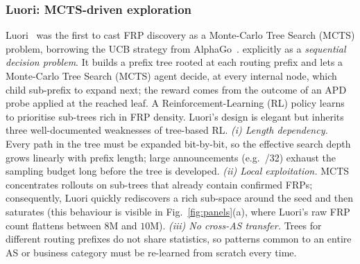 \documentclass[conference]{IEEEtran}
\begin{document}
\subsubsection{Luori: MCTS-driven exploration}
\label{sec:bg:luori}
Luori~\cite{cheng2024luori} was the first to cast FRP discovery
as a Monte-Carlo Tree Search (MCTS) problem, borrowing the UCB
strategy from AlphaGo~\cite{silver2016mcts}.
explicitly as a \emph{sequential decision problem}.  It builds a
prefix tree rooted at each routing prefix and lets a Monte-Carlo
Tree Search (MCTS) agent decide, at every internal node, which
child sub-prefix to expand next; the reward comes from the
outcome of an APD probe applied at the reached leaf.  A
Reinforcement-Learning (RL) policy learns to prioritise
sub-trees rich in FRP density.  Luori's design is elegant but
inherits three well-documented weaknesses of tree-based RL.
\emph{(i) Length dependency.}  Every path in the tree must
be expanded bit-by-bit, so the effective search depth grows
linearly with prefix length; large announcements (e.g.\ /32)
exhaust the sampling budget long before the tree is developed.
\emph{(ii) Local exploitation.}  MCTS concentrates rollouts on
sub-trees that already contain confirmed FRPs; consequently,
Luori quickly rediscovers a rich sub-space around the seed and
then saturates (this behaviour is visible in
Fig.~\ref{fig:panels}(a), where Luori's raw FRP count flattens
between $8$M and $10$M).
\emph{(iii) No cross-AS transfer.}  Trees for different routing
prefixes do not share statistics, so patterns common to an entire
AS or business category must be re-learned from scratch every time.
\end{document}
